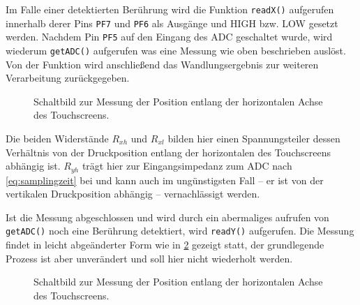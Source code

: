 		Im Falle einer detektierten Berührung wird die Funktion \texttt{readX()} aufgerufen innerhalb derer Pins \texttt{PF7} und \texttt{PF6} als Ausgänge und HIGH bzw. LOW gesetzt werden.
		Nachdem Pin \texttt{PF5} auf den Eingang des ADC geschaltet wurde, wird wiederum \texttt{getADC()} aufgerufen was eine Messung wie oben beschrieben auslöst.
		Von der Funktion wird anschließend das Wandlungsergebnis zur weiteren Verarbeitung zurückgegeben.
		\begin{figure}[h]
			\centering
			
			\caption{Schaltbild zur Messung der Position entlang der horizontalen Achse des Touchscreens.}
			\label{fig:readX schaltbild}
		\end{figure}
		Die beiden Widerstände \(R_{xh}\) und \(R_{xl}\) bilden hier einen Spannungsteiler dessen Verhältnis von der Druckposition entlang der horizontalen des Touchscreens abhängig ist.
		\(R_{yh}\) trägt hier zur Eingangsimpedanz zum ADC nach \cref{eq:samplingzeit} bei und kann auch im ungünstigsten Fall -- er ist von der vertikalen Druckposition abhängig -- vernachlässigt werden.\par
		Ist die Messung abgeschlossen und wird durch ein abermaliges aufrufen von \texttt{getADC()} noch eine Berührung detektiert, wird \texttt{readY()} aufgerufen.
		Die Messung findet in leicht abgeänderter Form wie in \cref{fig:readY schaltbild} gezeigt statt, der grundlegende Prozess ist aber unverändert und soll hier nicht wiederholt werden.
		\begin{figure}[h]
			\centering
			
			\caption{Schaltbild zur Messung der Position entlang der horizontalen Achse des Touchscreens.}
			\label{fig:readY schaltbild}
		\end{figure}

